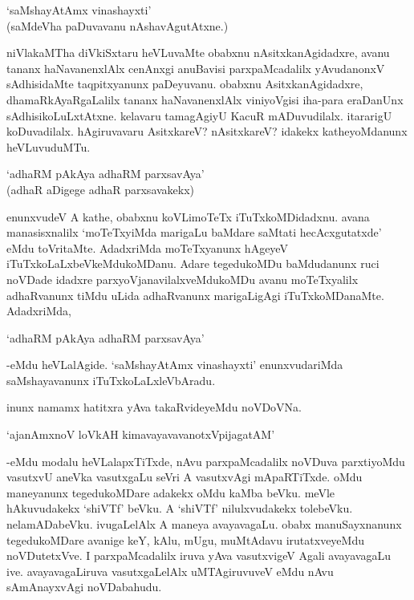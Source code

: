 \begin{shloka}
`saMshayAtAmx vinashayxti'\\
(saMdeVha paDuvavanu nAshavAgutAtxne.)
\end{shloka}

niVlakaMTha diVkiSxtaru heVLuvaMte obabxnu nAsitxkanAgidadxre, avanu tananx haNavanenxlAlx cenAnxgi anuBavisi parxpaMcadalilx yAvudanonxV sAdhisidaMte taqpitxyanunx paDeyuvanu. obabxnu AsitxkanAgidadxre, dhamaRkAyaRgaLalilx tananx haNavanenxlAlx viniyoVgisi iha-para eraDanUnx sAdhisikoLuLxtAtxne. kelavaru tamagAgiyU KacuR mADuvudilalx. itararigU koDuvadilalx. hAgiruvavaru AsitxkareV? nAsitxkareV? idakekx katheyoMdanunx heVLuvuduMTu.

\begin{shloka}
`adhaRM pAkAya adhaRM parxsavAya'\\
(adhaR aDigege adhaR parxsavakekx)
\end{shloka}

enunxvudeV A kathe, obabxnu koVLimoTeTx iTuTxkoMDidadxnu. avana manasisxnalilx `moTeTxyiMda marigaLu baMdare saMtati hecAcxgutatxde' eMdu toVritaMte. AdadxriMda moTeTxyanunx hAgeyeV iTuTxkoLaLxbeVkeMdukoMDanu. Adare tegedukoMDu baMdudanunx ruci noVDade idadxre parxyoVjanavilalxveMdukoMDu avanu moTeTxyalilx adhaRvanunx tiMdu uLida adhaRvanunx marigaLigAgi iTuTxkoMDanaMte. AdadxriMda,

\begin{shloka}
`adhaRM pAkAya adhaRM parxsavAya'
\end{shloka}

-eMdu heVLalAgide. `saMshayAtAmx vinashayxti' enunxvudariMda saMshayavanunx iTuTxkoLaLxleVbAradu.

inunx namamx hatitxra yAva takaRvideyeMdu noVDoVNa.

\begin{shloka}
`ajanAmxnoV loVkAH kimavayavavanotxVpi\s jagatAM'
\end{shloka}

-eMdu modalu heVLalapxTiTxde, nAvu parxpaMcadalilx noVDuva parxtiyoMdu vasutxvU aneVka vasutxgaLu seVri A vasutxvAgi mApaRTiTxde. oMdu maneyanunx tegedukoMDare adakekx oMdu kaMba beVku. meVle hAkuvudakekx `shiVTf' beVku. A `shiVTf' nilulxvudakekx tolebeVku. nelamADabeVku. ivugaLelAlx A maneya avayavagaLu. obabx manuSayxnanunx tegedukoMDare avanige keY, kAlu, mUgu, muMtAdavu irutatxveyeMdu noVDutetxVve. I parxpaMcadalilx iruva yAva vasutxvigeV Agali avayavagaLu ive. avayavagaLiruva vasutxgaLelAlx uMTAgiruvuveV eMdu nAvu sAmAnayxvAgi noVDabahudu.

